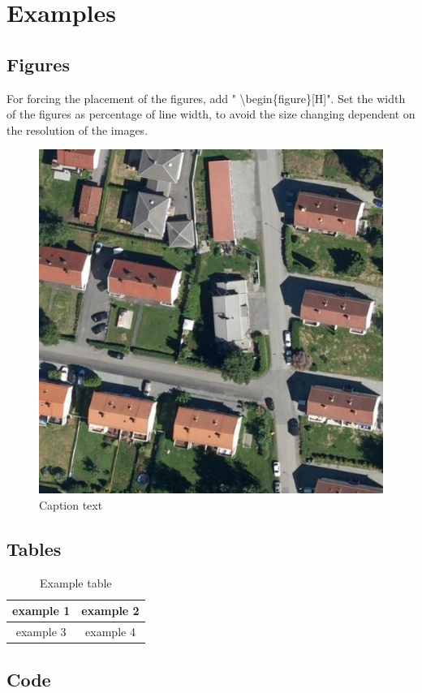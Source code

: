 \chapter{Examples}\label{chap:examples}

\section{Figures}

For forcing the placement of the figures, add " \textbackslash begin\{figure\}[H]". Set the width of the figures as percentage of line width, to avoid the size changing dependent on the resolution of the images.

\begin{figure}[H]
	\centering
	\includegraphics[width=0.5\linewidth]{img/example-data-1}
	\caption[Short figure text for list of figures]{Caption text}
	\label{fig:example-data-1}
\end{figure}


\section{Tables}

\begin{table}[H]
	\centering
	\begin{tabular}{|c|c|}
		\hline
		example 1 &example 2  \\ 
		\hline
		example 3 & example 4 \\ 
		\hline
	\end{tabular} 
	\caption[Short description for list of tables]{Example table}
	\label{tab:example}
\end{table}

\section{Code}

